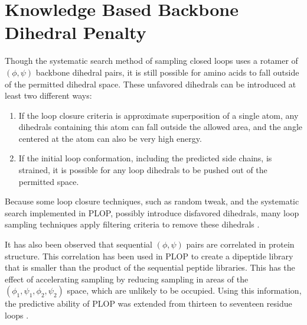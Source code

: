 \section{Knowledge Based Backbone Dihedral Penalty}
\label{section:unsorted/rfs}
Though the systematic search method of sampling closed loops uses a rotamer of $(\phi,\psi)$ backbone dihedral pairs, it is still possible for amino acids to fall outside of the permitted dihedral space.
These unfavored dihedrals can be introduced at least two different ways:
\begin{enumerate}
\item If the loop closure criteria is approximate superposition of a single atom, any dihedrals containing this atom can fall outside the allowed area, and the angle centered at the atom can also be very high energy.
\item If the initial loop conformation, including the predicted side chains, is strained, it is possible for any loop dihedrals to be pushed out of the permitted space.
\end{enumerate}
Because some loop closure techniques, such as random tweak, and the systematic search implemented in PLOP, possibly introduce disfavored dihedrals, many loop sampling techniques apply filtering criteria to remove these dihedrals \cite{fine1986predicting,shenkin1987predicting}.

It has also been observed that sequential $(\phi, \psi)$ pairs are correlated in protein structure.
This correlation has been used in PLOP to create a dipeptide library that is smaller than the product of the sequential peptide libraries.
This has the effect of accelerating sampling by reducing sampling in areas of the $(\phi_{1}, \psi_{1}, \phi_{2}, \psi_{2})$ space, which are unlikely to be occupied.
Using this information, the predictive ability of PLOP was extended from thirteen to seventeen residue loops \cite{zhao2011progress}.

